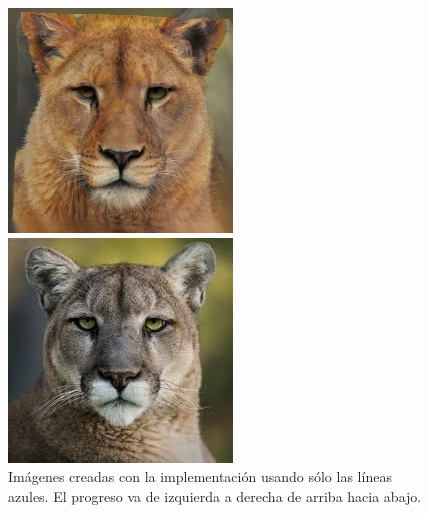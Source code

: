 \documentclass[conference]{IEEEtran}
\begin{document}
\begin{figure}[H]
\begin{multicols}{3}
    \includegraphics[width=1.0\linewidth]{results/cats/B/img20.png} \par
    \includegraphics[width=1.0\linewidth]{results/cats/B/img50.png} \par
\end{multicols}
\caption{Imágenes creadas con la implementación usando sólo las líneas azules. El progreso va de izquierda a derecha de arriba hacia abajo.}
\end{figure}
\end{document}
